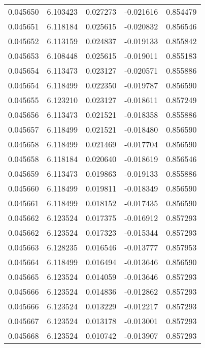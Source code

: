 \begin{tabular}{lrrrr}
0.045650    &  6.103423 &  0.027273 & -0.021616 &             0.854479 \\
0.045651    &  6.118184 &  0.025615 & -0.020832 &             0.856546 \\
0.045652    &  6.113159 &  0.024837 & -0.019133 &             0.855842 \\
0.045653    &  6.108448 &  0.025615 & -0.019011 &             0.855183 \\
0.045654    &  6.113473 &  0.023127 & -0.020571 &             0.855886 \\
0.045654    &  6.118499 &  0.022350 & -0.019787 &             0.856590 \\
0.045655    &  6.123210 &  0.023127 & -0.018611 &             0.857249 \\
0.045656    &  6.113473 &  0.021521 & -0.018358 &             0.855886 \\
0.045657    &  6.118499 &  0.021521 & -0.018480 &             0.856590 \\
0.045658    &  6.118499 &  0.021469 & -0.017704 &             0.856590 \\
0.045658    &  6.118184 &  0.020640 & -0.018619 &             0.856546 \\
0.045659    &  6.113473 &  0.019863 & -0.019133 &             0.855886 \\
0.045660    &  6.118499 &  0.019811 & -0.018349 &             0.856590 \\
0.045661    &  6.118499 &  0.018152 & -0.017435 &             0.856590 \\
0.045662    &  6.123524 &  0.017375 & -0.016912 &             0.857293 \\
0.045662    &  6.123524 &  0.017323 & -0.015344 &             0.857293 \\
0.045663    &  6.128235 &  0.016546 & -0.013777 &             0.857953 \\
0.045664    &  6.118499 &  0.016494 & -0.013646 &             0.856590 \\
0.045665    &  6.123524 &  0.014059 & -0.013646 &             0.857293 \\
0.045666    &  6.123524 &  0.014836 & -0.012862 &             0.857293 \\
0.045666    &  6.123524 &  0.013229 & -0.012217 &             0.857293 \\
0.045667    &  6.123524 &  0.013178 & -0.013001 &             0.857293 \\
0.045668    &  6.123524 &  0.010742 & -0.013907 &             0.857293 \\

\end{tabular}
